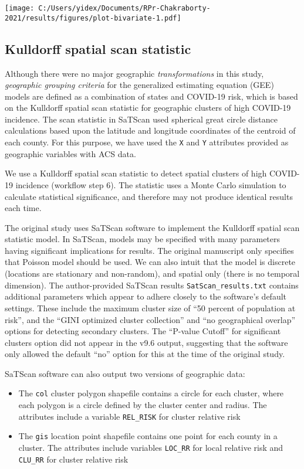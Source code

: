 \documentclass[
]{article}
\providecommand{\tightlist}{%
  \setlength{\itemsep}{0pt}\setlength{\parskip}{0pt}}
\begin{document}
\texttt{[image: C:/Users/yidex/Documents/RPr-Chakraborty-2021/results/figures/plot-bivariate-1.pdf]}

\hypertarget{kulldorff-spatial-scan-statistic}{%
\subsection{Kulldorff spatial scan
statistic}\label{kulldorff-spatial-scan-statistic}}

Although there were no major geographic \emph{transformations} in this
study, \emph{geographic grouping criteria} for the generalized
estimating equation (GEE) models are defined as a combination of states
and COVID-19 risk, which is based on the Kulldorff spatial scan
statistic for geographic clusters of high COVID-19 incidence. The scan
statistic in SaTScan used spherical great circle distance calculations
based upon the latitude and longitude coordinates of the centroid of
each county. For this purpose, we have used the \texttt{X} and
\texttt{Y} attributes provided as geographic variables with ACS data.

We use a Kulldorff spatial scan statistic to detect spatial clusters of
high COVID-19 incidence (workflow step 6). The statistic uses a Monte
Carlo simulation to calculate statistical significance, and therefore
may not produce identical results each time.

The original study uses SaTScan software to implement the Kulldorff
spatial scan statistic model. In SaTScan, models may be specified with
many parameters having significant implications for results. The
original manuscript only specifies that Poisson model should be used. We
can also intuit that the model is discrete (locations are stationary and
non-random), and spatial only (there is no temporal dimension). The
author-provided SaTScan results \texttt{SatScan\_results.txt} contains
additional parameters which appear to adhere closely to the software's
default settings. These include the maximum cluster size of ``50 percent
of population at risk'', and the ``GINI optimized cluster collection''
and ``no geographical overlap'' options for detecting secondary
clusters. The ``P-value Cutoff'' for significant clusters option did not
appear in the v9.6 output, suggesting that the software only allowed the
default ``no'' option for this at the time of the original study.

SaTScan software can also output two versions of geographic data:

\begin{itemize}
\tightlist
\item
  The \texttt{col} cluster polygon shapefile contains a circle for each
  cluster, where each polygon is a circle defined by the cluster center
  and radius. The attributes include a variable \texttt{REL\_RISK} for
  cluster relative risk
\item
  The \texttt{gis} location point shapefile contains one point for each
  county in a cluster. The attributes include variables \texttt{LOC\_RR}
  for local relative risk and \texttt{CLU\_RR} for cluster relative risk
\end{itemize}
\end{document}
